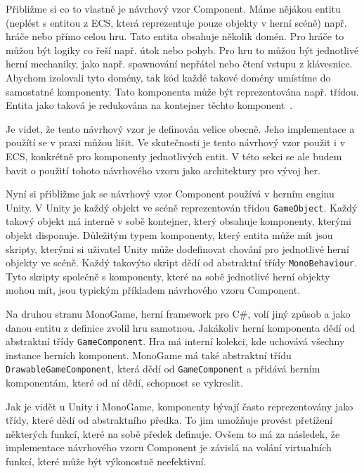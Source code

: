 Přibližme si co to vlastně je návrhový vzor Component. Máme nějákou entitu (neplést s entitou z ECS, která reprezentuje pouze objekty v herní scéně) např. hráče nebo přímo celou hru. Tato entita obsahuje několik domén. Pro hráče to můžou být logiky co řeší např. útok nebo pohyb. Pro hru to můžou být jednotlivé herní mechaniky, jako např. spawnování nepřátel nebo čtení vstupu z klávesnice. Abychom izolovali tyto domény, tak kód každé takové domény umístíme do samostatné komponenty. Tato komponenta může být reprezentována např. třídou. Entita jako taková je redukována na kontejner těchto komponent~\cite{nystrom2014game}.


Je videt, že tento návrhový vzor je definován velice obecně. Jeho implementace a použítí se v praxi můžou lišit. Ve skutečnosti je tento návrhový vzor použit i v ECS, konkrétně pro komponenty jednotlivých entit. V této sekci se ale budem bavit o použití tohoto návrhového vzoru jako architektury pro vývoj her.

Nyní si přibližme jak se návrhový vzor Component používá v herním enginu Unity. V Unity je každý objekt ve scéně reprezentován třidou \verb|GameObject|. Každý takový objekt má interně v sobě kontejner, který obsahuje komponenty, kterými objekt disponuje. Důležitým typem komponenty, který entita může mít jsou skripty, kterými si uživatel Unity může dodefinovat chování pro jednotlivé herní objekty ve scéně. Každý takovýto skript dědí od abstraktní třídy \verb|MonoBehaviour|. Tyto skripty společně s komponenty, které na sobě jednotlivé herní objekty mohou mít, jsou typickým příkladem návrhového vzoru Component.

Na druhou stranu MonoGame, herní framework pro C\#, volí jiný způsob a jako danou entitu z definice zvolil hru samotnou. Jakákoliv herní komponenta dědí od abstraktní třídy \verb|GameComponent|. Hra má interní kolekci, kde uchovává všechny instance herních komponent. MonoGame má také abstraktní třídu \verb|DrawableGameComponent|, která dědí od \verb|GameComponent| a přidává herním komponentám, které od ní dědí, schopnost se vykreslit.

Jak je vidět u Unity i MonoGame, komponenty bývají často reprezentovány jako třídy, které dědí od abstraktního předka. To jim umožňuje provést přetížení některých funkcí, které na sobě předek definuje. Ovšem to má za následek, že implementace návrhového vzoru Component je závislá na volání virtualních funkcí, které může být výkonostně neefektivní.

